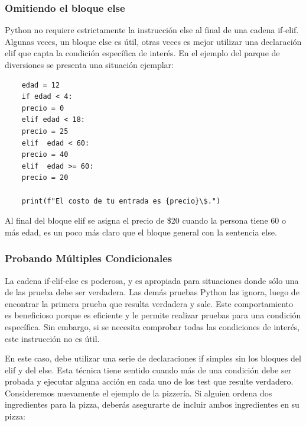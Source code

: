 \subsubsection{Omitiendo el bloque {\ttfamily else}}

Python no requiere estrictamente la instrucción  {\ttfamily else} al final de una cadena {\ttfamily  if-elif}.
Algunas  veces, un bloque {\ttfamily else}  es útil, otras veces es mejor utilizar una 
declaración {\ttfamily elif}  que capta la condición específica de interés. En el ejemplo del parque de diversiones se presenta una situación ejemplar:

\hspace{-2.2cm}{\ttfamily \scriptsize parque.py}\vspace{-0.5cm}
\begin{lstlisting}
	edad = 12
	if edad < 4:
	precio = 0
	elif edad < 18:
	precio = 25
	elif  edad < 60:
	precio = 40
	elif  edad >= 60:
	precio = 20
	
	print(f"El costo de tu entrada es {precio}\$.")    
\end{lstlisting}

Al final del bloque  {\ttfamily elif}  se asigna el precio de \$20 cuando la persona tiene 60 o más edad, 
es un poco más claro que el bloque general con la sentencia  {\ttfamily else}.  




\subsubsection{Probando Múltiples Condicionales}

La cadena  {\ttfamily if-elif-else} es poderosa, y es apropiada para situaciones donde sólo una de las prueba debe ser verdadera. 
Las demás pruebas Python las ignora, luego de encontrar  la primera prueba que resulta verdadera y sale.   Este comportamiento es beneficioso porque es eficiente y le permite realizar pruebas para una condición específica. Sin embargo, si se necesita comprobar todas las condiciones de interés, este instrucción no es útil.

En este caso, debe utilizar una serie de declaraciones {\ttfamily if} simples sin los bloques del  {\ttfamily elif}  y 
del {\ttfamily else}.  Esta técnica tiene sentido cuando más de una condición debe ser probada y ejecutar alguna acción en cada uno de los test que resulte verdadero.\\


Consideremos nuevamente el ejemplo de la pizzería. Si alguien ordena  dos ingredientes para la 
pizza, deberás asegurarte de incluir ambos ingredientes en su pizza: 

